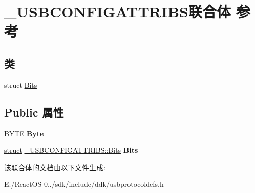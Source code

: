 \hypertarget{union___u_s_b_c_o_n_f_i_g_a_t_t_r_i_b_s}{}\section{\+\_\+\+U\+S\+B\+C\+O\+N\+F\+I\+G\+A\+T\+T\+R\+I\+B\+S联合体 参考}
\label{union___u_s_b_c_o_n_f_i_g_a_t_t_r_i_b_s}
\subsection*{类}
\begin{DoxyCompactItemize}
\item 
struct \hyperlink{struct___u_s_b_c_o_n_f_i_g_a_t_t_r_i_b_s_1_1_bits}{Bits}
\end{DoxyCompactItemize}
\subsection*{Public 属性}
\begin{DoxyCompactItemize}
\item 
\mbox{\label{union___u_s_b_c_o_n_f_i_g_a_t_t_r_i_b_s_aa2936ed944cfabd1c0b549a189ec0f3a}} 
B\+Y\+TE {\bfseries Byte}
\item 
\mbox{\label{union___u_s_b_c_o_n_f_i_g_a_t_t_r_i_b_s_a99c52a0d7f7706217afe55ba556d7738}} 
\hyperlink{interfacestruct}{struct} \hyperlink{struct___u_s_b_c_o_n_f_i_g_a_t_t_r_i_b_s_1_1_bits}{\+\_\+\+U\+S\+B\+C\+O\+N\+F\+I\+G\+A\+T\+T\+R\+I\+B\+S\+::\+Bits} {\bfseries Bits}
\end{DoxyCompactItemize}


该联合体的文档由以下文件生成\+:\begin{DoxyCompactItemize}
\item 
E\+:/\+React\+O\+S-\/0../sdk/include/ddk/usbprotocoldefs.\+h\end{DoxyCompactItemize}
